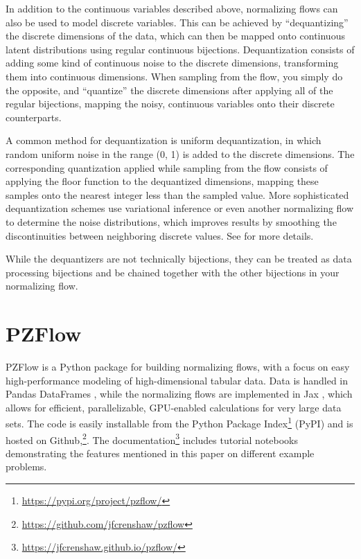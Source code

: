 \documentclass[twocolumn,twocolappendix]{aastex631}
\begin{document}
In addition to the continuous variables described above, normalizing flows can also be used to model discrete variables.
This can be achieved by ``dequantizing'' the discrete dimensions of the data, which can then be mapped onto continuous latent distributions using regular continuous bijections.
Dequantization consists of adding some kind of continuous noise to the discrete dimensions, transforming them into continuous dimensions.
When sampling from the flow, you simply do the opposite, and ``quantize'' the discrete dimensions after applying all of the regular bijections, mapping the noisy, continuous variables onto their discrete counterparts.

A common method for dequantization is uniform dequantization, in which random uniform noise in the range (0, 1) is added to the discrete dimensions.
The corresponding quantization applied while sampling from the flow consists of applying the floor function to the dequantized dimensions, mapping these samples onto the nearest integer less than the sampled value.
More sophisticated dequantization schemes use variational inference or even another normalizing flow to determine the noise distributions, which improves results by smoothing the discontinuities between neighboring discrete values.
See \citet{ho2019} \citet{hoogeboom2020} for more details.

While the dequantizers are not technically bijections, they can be treated as data processing bijections and be chained together with the other bijections in your normalizing flow.


\section{PZFlow}
\label{sec:pzflow}

PZFlow is a Python package for building normalizing flows, with a focus on easy high-performance modeling of high-dimensional tabular data.
Data is handled in Pandas DataFrames \citep{pandas}, while the normalizing flows are implemented in Jax \citep{jax}, which allows for efficient, parallelizable, GPU-enabled calculations for very large data sets.
The code is easily installable from the Python Package Index\footnote{\url{https://pypi.org/project/pzflow/}} (PyPI) and is hosted on Github,\footnote{\url{https://github.com/jfcrenshaw/pzflow}}.
The documentation\footnote{\url{https://jfcrenshaw.github.io/pzflow/}} includes tutorial notebooks demonstrating the features mentioned in this paper on different example problems.
\end{document}
